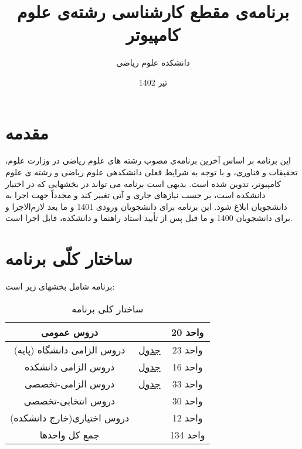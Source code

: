\documentclass{article}
\title{
    برنامه‌ی مقطع کارشناسی رشته‌ی علوم کامپیوتر
}
\author{
    دانشکده علوم ریاضی
}
\date{
    تیر 1402
}
\begin{document}
    \maketitle
    \section{مقدمه }
    این برنامه بر اساس آخرین برنامه‌ی مصوب رشته های علوم ریاضی در وزارت علوم، تحقیقات و فناوری، و با توجه به شرایط فعلی دانشکدهی علوم ریاضی و رشته ی علوم کامپیوتر، تدوین شده است. بدیهی است برنامه می تواند در بخشهایی که در اختیار دانشکده است، بر حسب نیازهای جاری و آتی تغییر کند و مجدداً جهت اجرا به دانشجویان ابلاغ شود. این برنامه برای دانشجویان ورودی 1401 و ما بعد لازم‌الاجرا و برای دانشجویان 1400 و ما قبل پس از تأیید استاد راهنما و دانشکده، قابل اجرا است.
    
\pagebreak
\tableofcontents
\pagebreak
\listoftables
\newpage
\section{ساختار کلّی برنامه}
    برنامه شامل بخشهای زیر است:
\begin{table}[H]
\begin{center}
        \begin{tabular}{|c | c | c|}
            \hline
            {دروس عمومی} & & {20 واحد} \\
            \hline
            {دروس الزامی دانشگاه (پایه)}\LR{)} & {
            \href{cs-t1}{
            	جدول 
            }
            } & {23 واحد} \\
            \hline
            {دروس الزامی دانشکده} & {
            \href{cs-t2}{
            	جدول 
            }
            } & {16 واحد} \\
            \hline
            {دروس الزامی-تخصصی} & {
            	\href{cs-t3}{
            		جدول 
            	}
            	} & {33 واحد} \\
            \hline
            {دروس انتخابی-تخصصی} & & {30 واحد} \\
            \hline
            {دروس اختیاری(خارج دانشکده) } & & {12 واحد} \\
            \hline
            {جمع کل واحدها} & & {134 واحد} \\
            \hline
        \end{tabular}
		\caption{\label{cs-t1}
	ساختار کلی برنامه
		}
    \end{center}
\end{table}
\end{document}
